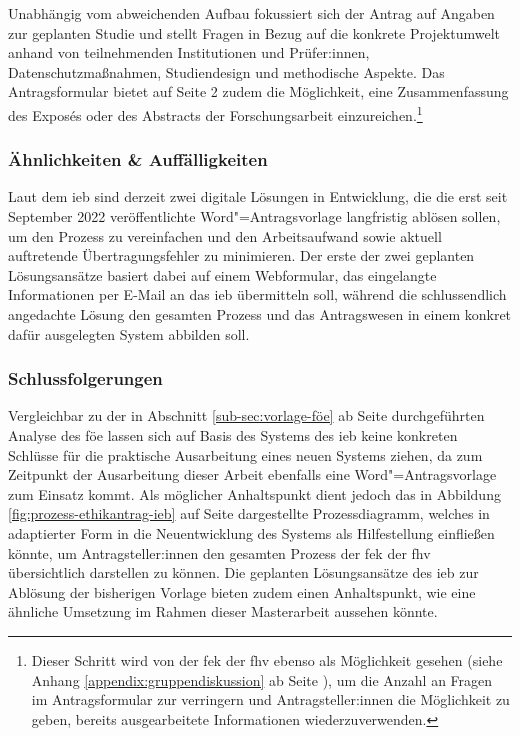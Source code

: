 \documentclass[a4paper,12pt,twoside,numbers=noendperiod]{scrreprt}
\begin{document}
\medskip

Unabhängig vom abweichenden Aufbau fokussiert sich der Antrag auf Angaben zur geplanten Studie und stellt Fragen in Bezug auf die konkrete Projektumwelt anhand von teilnehmenden Institutionen und Prüfer:innen, Datenschutzmaßnahmen, Studiendesign und methodische Aspekte. Das Antragsformular bietet auf Seite 2 zudem die Möglichkeit, eine Zusammenfassung des Exposés oder des Abstracts der Forschungsarbeit einzureichen.\footnote{Dieser Schritt wird von der \ac{fek} der \ac{fhv} ebenso als Möglichkeit gesehen (siehe Anhang \ref{appendix:gruppendiskussion} ab Seite \pageref{appendix:gruppendiskussion}), um die Anzahl an Fragen im Antragsformular zur verringern und Antragsteller:innen die Möglichkeit zu geben, bereits ausgearbeitete Informationen wiederzuverwenden.}

\subsubsection*{Ähnlichkeiten \& Auffälligkeiten}
\label{sub-sub-sec:ähnlichkeiten-auffälligkeiten-fh-oö}

Laut dem \ac{ieb} sind derzeit zwei digitale Lösungen in Entwicklung, die die erst seit September 2022 veröffentlichte Word"=Antragsvorlage langfristig ablösen sollen, um den Prozess zu vereinfachen und den Arbeitsaufwand sowie aktuell auftretende Übertragungsfehler zu minimieren. Der erste der zwei geplanten Lösungsansätze basiert dabei auf einem Webformular, das eingelangte Informationen per E-Mail an das \ac{ieb} übermitteln soll, während die schlussendlich angedachte Lösung den gesamten Prozess und das Antragswesen in einem konkret dafür ausgelegten System abbilden soll. \cite{rosendahl-huber_extern-erfahrungen_2023}

\subsubsection*{Schlussfolgerungen}
\label{sub-sub-sec:schlussfolgerungen-fh-oö}

Vergleichbar zu der in Abschnitt \ref{sub-sec:vorlage-föe} ab Seite \pageref{sub-sec:vorlage-föe} durchgeführten Analyse des \ac{föe} lassen sich auf Basis des Systems des \ac{ieb} keine konkreten Schlüsse für die praktische Ausarbeitung eines neuen Systems ziehen, da zum Zeitpunkt der Ausarbeitung dieser Arbeit ebenfalls eine Word"=Antragsvorlage zum Einsatz kommt. Als möglicher Anhaltspunkt dient jedoch das in Abbildung \ref{fig:prozess-ethikantrag-ieb} auf Seite \pageref{fig:prozess-ethikantrag-ieb} dargestellte Prozessdiagramm, welches in adaptierter Form in die Neuentwicklung des Systems als Hilfestellung einfließen könnte, um Antragsteller:innen den gesamten Prozess der \ac{fek} der \ac{fhv} übersichtlich darstellen zu können. Die geplanten Lösungsansätze des \ac{ieb} zur Ablösung der bisherigen Vorlage bieten zudem einen Anhaltspunkt, wie eine ähnliche Umsetzung im Rahmen dieser Masterarbeit aussehen könnte.
\end{document}
